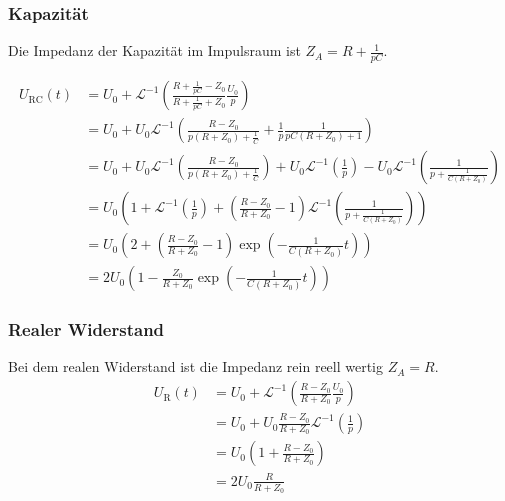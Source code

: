 \subsubsection{Kapazität}
Die Impedanz der Kapazität im Impulsraum ist $Z_A = R + \frac{1}{pC}$.

\begin{align*}
	U_\text{RC}(t) 
	&= U_0 + \mathcal{L}^{-1}\left(\frac{R+ \frac{1}{pC}-Z_0}{R+ \frac{1}{pC}+Z_0}\frac{U_0}{p}\right) \\
	&= U_0 + U_0 \mathcal{L}^{-1} \left( \frac{R-Z_0}{p(R+Z_0) +  \frac{1}{C}}   
	+ \frac{1}{p} \frac{1}{pC(R+Z_0) +1 } \right) \\
	&= U_0 + U_0\mathcal{L}^{-1} \left( \frac{R-Z_0}{p(R+Z_0) +  \frac{1}{C}} \right) + U_0  \mathcal{L}^{-1} \left( \frac{1}{p} \right) - U_0 \mathcal{L}^{-1} \left( \frac{1}{p + \frac{1}{C(R+Z_0)}} \right) \\
		&= U_0\left( 1+  \mathcal{L}^{-1} \left( \frac{1}{p}\right) +  \left(\frac{R-Z_0}{R+Z_0}-1\right) \mathcal{L}^{-1} \left( \frac{1}{p + \frac{1}{C(R+Z_0)}} \right) \right) \\
		&= U_0\left(2 +  \left(\frac{R-Z_0}{R+Z_0}-1\right) \exp \left( - \frac{1}{C(R+Z_0)} t\right)  \right) \\
	&= 2U_0\left(1 -  \frac{Z_0}{R+Z_0} \exp \left( - \frac{1}{C(R+Z_0)} t\right)  \right)
\end{align*}

\subsubsection{Realer Widerstand}
Bei dem realen Widerstand ist die Impedanz rein reell wertig $Z_A = R$.
\begin{align*}
	U_\text{R}(t) 
	&= U_0 + \mathcal{L}^{-1}\left(\frac{R -Z_0}{R +Z_0}\frac{U_0}{p}\right) \\
	&= U_0 + U_0\frac{R -Z_0}{R +Z_0} \mathcal{L}^{-1}\left(\frac{1}{p} \right) \\
	&= U_0\left(1 +  \frac{R -Z_0}{R +Z_0} \right) \\
	&= 2 U_0 \frac{R}{R+Z_0}
\end{align*}

